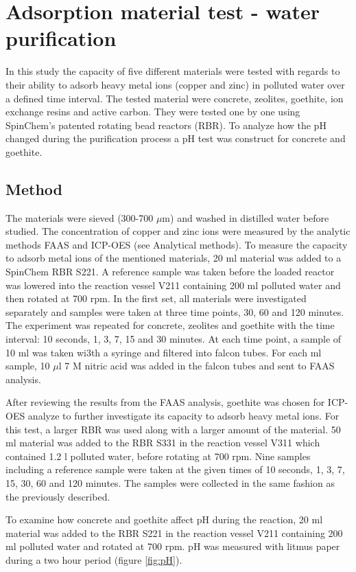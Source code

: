 \section{Adsorption material test - water purification}
In this study the capacity of five different materials were tested with regards to their ability to adsorb heavy metal ions (copper and zinc) in polluted water over a defined time interval. The tested material were concrete, zeolites, goethite, ion exchange resins and active carbon. They were tested one by one using SpinChem\textsuperscript{\textregistered}’s patented rotating bead reactors (RBR). To analyze how the pH changed during the purification process a pH test was construct for concrete and goethite. 
\subsection{Method}
The materials were sieved (300-700 $\mu$m) and washed in distilled water before studied. The concentration of copper and zinc ions were measured by the analytic methods FAAS and ICP-OES (see Analytical methods). To measure the capacity to adsorb metal ions of the mentioned materials, 20 ml material was added to a SpinChem\textsuperscript{\textregistered} RBR S221. A reference sample was taken before the loaded reactor was lowered into the reaction vessel V211 containing 200 ml polluted water and then rotated at 700 rpm. In the first set, all materials were investigated separately and samples were taken at three time points, 30, 60 and 120 minutes. The experiment was repeated for concrete, zeolites and goethite with the time interval: 10 seconds, 1, 3, 7, 15 and 30 minutes. At each time point, a sample of 10 ml was taken wi3th a syringe and filtered into falcon tubes. For each ml sample, 10 $\mu$l 7 M nitric acid was added in the falcon tubes and sent to FAAS analysis. 

After reviewing the results from the FAAS analysis, goethite was chosen for ICP-OES analyze to further investigate its capacity to adsorb heavy metal ions. For this test, a larger RBR was used along with a larger amount of the material. 50 ml material was added to the RBR S331 in the reaction vessel V311 which contained 1.2 l polluted water, before rotating at 700 rpm. Nine samples including a reference sample were taken at the given times of 10 seconds, 1, 3, 7, 15, 30, 60 and 120 minutes. The samples were collected in the same fashion as the previously described.

To examine how concrete and goethite affect pH during the reaction, 20 ml material was added to the RBR S221 in the reaction vessel V211 containing 200 ml polluted water and rotated at 700 rpm. pH was measured with litmus paper during a two hour period (figure \ref{fig:pH}).

